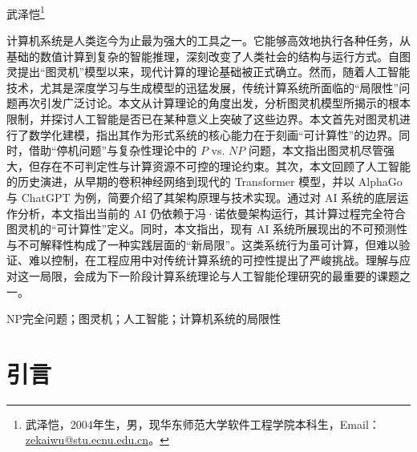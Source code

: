\documentclass[UTF8,openany,zihao=5]{ctexbook}
\begin{document}
\setcounter{page}{1}

\begin{center}
  ~\\[1em]
  {
  \heiti{}\\
  \\
  \vspace{0.8em}
  \kaishu{}武泽恺\footnote{武泽恺，2004年生，男，现华东师范大学软件工程学院本科生，Email：\url{zekaiwu@stu.ecnu.edu.cn}。}\\
  \vspace{0.2em}
  \songti{}
  }
\end{center}

\pagestyle{plain}

\linespread{1.1}
{
  计算机系统是人类迄今为止最为强大的工具之一。它能够高效地执行各种任务，从基础的数值计算到复杂的智能推理，深刻改变了人类社会的结构与运行方式。自图灵提出“图灵机”模型以来，现代计算的理论基础被正式确立。然而，随着人工智能技术，尤其是深度学习与生成模型的迅猛发展，传统计算系统所面临的“局限性”问题再次引发广泛讨论。本文从计算理论的角度出发，分析图灵机模型所揭示的根本限制，并探讨人工智能是否已在某种意义上突破了这些边界。本文首先对图灵机进行了数学化建模，指出其作为形式系统的核心能力在于刻画“可计算性”的边界。同时，借助“停机问题”与复杂性理论中的 $P$ vs. $NP$ 问题，本文指出图灵机尽管强大，但存在不可判定性与计算资源不可控的理论约束。其次，本文回顾了人工智能的历史演进，从早期的卷积神经网络到现代的 Transformer 模型，并以 AlphaGo 与 ChatGPT 为例，简要介绍了其架构原理与技术实现。通过对 AI 系统的底层运作分析，本文指出当前的 AI 仍依赖于冯·诺依曼架构运行，其计算过程完全符合图灵机的“可计算性”定义。同时，本文指出，现有 AI 系统所展现出的不可预测性与不可解释性构成了一种实践层面的“新局限”。这类系统行为虽可计算，但难以验证、难以控制，在工程应用中对传统计算系统的可控性提出了严峻挑战。理解与应对这一局限，会成为下一阶段计算系统理论与人工智能伦理研究的最重要的课题之一。

  NP完全问题；图灵机；人工智能；计算机系统的局限性
}
\linespread{1.25}

\songti{}
\chapter{引言}
\end{document}
